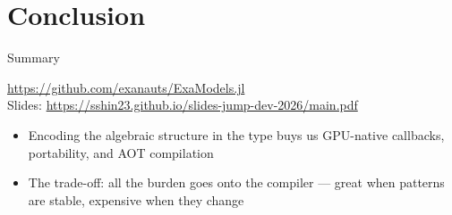 \documentclass[aspectratio=169,11pt]{beamer}
\begin{document}
\section{Conclusion}
\begin{frame}{Summary}
  \begin{center}
    \url{https://github.com/exanauts/ExaModels.jl}\\[2pt]
    {Slides: \url{https://sshin23.github.io/slides-jump-dev-2026/main.pdf}}
  \end{center}
  \smallskip
  \begin{itemize}\itemsep2pt
  \item Encoding the algebraic structure in the type buys us \alert{GPU-native callbacks}, portability, and \alert{AOT compilation}
  \item The trade-off: \alert{all the burden goes onto the compiler} --- great when patterns are stable, expensive when they change
  \end{itemize}
  \smallskip
\end{frame}
\end{document}
